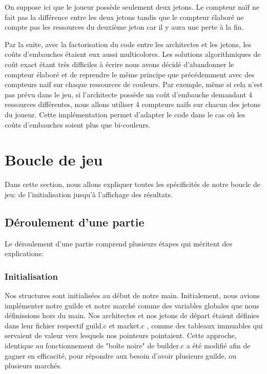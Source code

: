 \documentclass{article}
\begin{document}
    On suppose ici que le joueur possède seulement deux jetons. Le compteur naïf ne fait pas la différence entre les deux jetons tandis que le compteur élaboré ne compte pas les ressources du deuxième jeton car il y aura une perte à la fin.
    
    \vspace{1em} Par la suite, avec la factorisation du code entre les architectes et les jetons, les coûts d'embauches étaient eux aussi multicolores. Les solutions algorithmiques de coût exact étant très difficiles à écrire nous avons décidé d'abandonner le compteur élaboré et de reprendre le même principe que précédemment avec des compteurs naïf sur chaque ressources de couleurs. Par exemple, même si cela n'est pas prévu dans le jeu, si l'architecte possède un coût d'embauche demandant 4 ressources différentes, nous allons utiliser 4 compteurs naïfs sur chacun des jetons du joueur. Cette implémentation permet d'adapter le code dans le cas où les coûts d'embauches soient plus que bi-couleurs.

\section{Boucle de jeu}
    Dans cette section, nous allons expliquer toutes les spécificités de notre boucle de jeu: de l'initialisation jusqu'à l'affichage des résultats.
    
    \subsection{Déroulement d'une partie}

    Le déroulement d'une partie comprend plusieurs étapes qui méritent des explications:
    \subsubsection{Initialisation}
    \hspace{1em} Nos structures sont initialisées au début de notre main. Initialement, nous avions implémenter notre guilde et notre marché comme des variables globales que nous définissions hors du main. Nos architectes et nos jetons de départ étaient définies dans leur fichier respectif guild.c et market.c , comme des tableaux immuables qui servaient de valeur vers lesquels nos pointeurs pointaient. Cette approche, identique au fonctionnement de "boîte noire" de builder.c a été modifié afin de gagner en efficacité, pour répondre aux besoin d'avoir plusieurs guilde, ou plusieurs marchés. 
      
\end{document}
